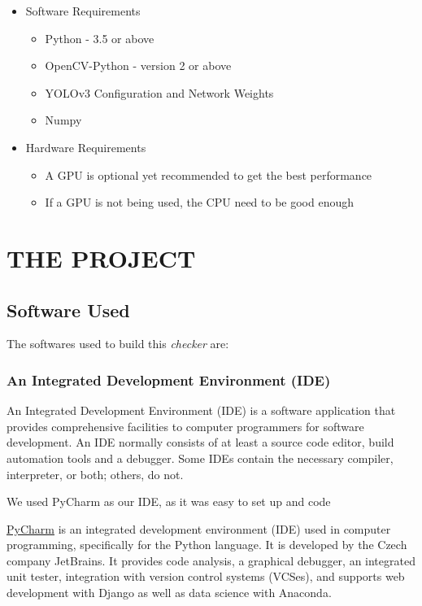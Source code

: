 \documentclass[a4paper]{article}
\begin{document}
\begin{itemize}
    \item Software Requirements
          \begin{itemize}
              \item Python - 3.5 or above
              \item OpenCV-Python - version 2 or above
              \item YOLOv3 Configuration and Network Weights
              \item Numpy
          \end{itemize}

    \item Hardware Requirements
          \begin{itemize}
              \item A GPU is optional yet recommended to get the best performance
              \item If a GPU is not being used, the CPU need to be good enough
          \end{itemize}
\end{itemize}
\pagebreak

\section{THE PROJECT}
\subsection{Software Used}
The softwares used to build this \textit{checker} are:

\subsubsection{An Integrated Development Environment (IDE)}
An Integrated Development Environment (IDE) is a software application that
provides comprehensive facilities to computer programmers for software
development. An IDE normally consists of at least a source code editor, build
automation tools and a debugger. Some IDEs contain the necessary compiler,
interpreter, or both; others, do not.

We used PyCharm as our IDE, as it was easy to set up and code

\href{https://www.jetbrains.com/pycharm/}{PyCharm} is an integrated development environment (IDE) used in computer programming, specifically for the Python language. It is developed by the Czech company JetBrains. It provides code analysis, a graphical debugger, an integrated unit tester, integration with version control systems (VCSes), and supports web development with Django as well as data science with Anaconda.
\end{document}
